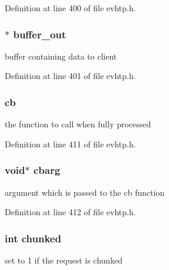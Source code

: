 \-Definition at line 400 of file evhtp.\-h.

\hypertarget{structevhtp__request__s_aa2a97cf41f1776b60c84e31eb6778d05}{
\subsubsection[{buffer\-\_\-out}]{$\ast$ {\bf buffer\-\_\-out}}}\label{structevhtp__request__s_aa2a97cf41f1776b60c84e31eb6778d05}
buffer containing data to client 

\-Definition at line 401 of file evhtp.\-h.

\hypertarget{structevhtp__request__s_a783ee29046d4ff3e8c75f811e80fd57b}{
\subsubsection[{cb}]{ {\bf cb}}}\label{structevhtp__request__s_a783ee29046d4ff3e8c75f811e80fd57b}
the function to call when fully processed 

\-Definition at line 411 of file evhtp.\-h.

\hypertarget{structevhtp__request__s_aafd3d1a6343925cb274875556a6faa0e}{
\subsubsection[{cbarg}]{\setlength{\rightskip}{0pt plus 5cm}void$\ast$ {\bf cbarg}}}\label{structevhtp__request__s_aafd3d1a6343925cb274875556a6faa0e}
argument which is passed to the cb function 

\-Definition at line 412 of file evhtp.\-h.

\hypertarget{structevhtp__request__s_a9fc0096dd38d9cc699740cf0adb6e6f4}{
\subsubsection[{chunked}]{\setlength{\rightskip}{0pt plus 5cm}int {\bf chunked}}}\label{structevhtp__request__s_a9fc0096dd38d9cc699740cf0adb6e6f4}
set to 1 if the request is chunked 

